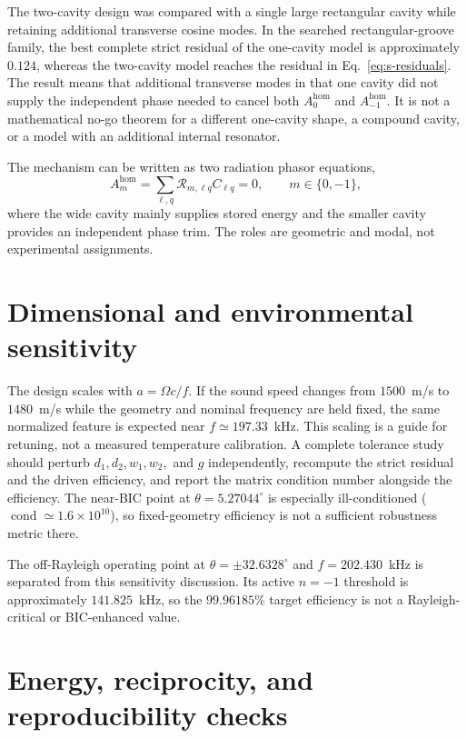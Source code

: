 \documentclass[aps,prl,reprint,superscriptaddress,nofootinbib,floatfix]{revtex4-2}
\providecommand{\hom}{\mathrm{hom}}
\begin{document}
The two-cavity design was compared with a single large rectangular cavity while
retaining additional transverse cosine modes.  In the searched
rectangular-groove family, the best complete strict residual of the one-cavity
model is approximately $0.124$, whereas the two-cavity model reaches the
residual in Eq.~\eqref{eq:s-residuals}.  The result means that additional
transverse modes in that one cavity did not supply the independent phase needed
to cancel both $A_0^{\hom}$ and $A_{-1}^{\hom}$.  It is not a mathematical
no-go theorem for a different one-cavity shape, a compound cavity, or a model
with an additional internal resonator.

The mechanism can be written as two radiation phasor equations,
\begin{equation}
 A_m^{\hom}=\sum_{\ell,q}\mathcal R_{m,\ell q}C_{\ell q}=0,
 \qquad m\in\{0,-1\},
 \label{eq:s-phasors}
\end{equation}
where the wide cavity mainly supplies stored energy and the smaller cavity
provides an independent phase trim.  The roles are geometric and modal, not
experimental assignments.

\section{Dimensional and environmental sensitivity}
\label{sec:s-tolerance}

The design scales with $a=\Omega c/f$.  If the sound speed changes from
$1500$~m/s to $1480$~m/s while the geometry and nominal frequency are held
fixed, the same normalized feature is expected near
$f\simeq197.33$~kHz.  This scaling is a guide for retuning, not a measured
temperature calibration.  A complete tolerance study should perturb
$d_1,d_2,w_1,w_2,$ and $g$ independently, recompute the strict residual and
the driven efficiency, and report the matrix condition number alongside the
efficiency.  The near-BIC point at $\theta=5.27044^{\circ}$ is especially
ill-conditioned ($\operatorname{cond}\simeq1.6\times10^{10}$), so fixed-geometry
efficiency is not a sufficient robustness metric there.

The off-Rayleigh operating point at $\theta=\pm32.6328^{\circ}$ and
$f=202.430$~kHz is separated from this sensitivity discussion.  Its active
$n=-1$ threshold is approximately $141.825$~kHz, so the $99.96185\%$ target
efficiency is not a Rayleigh-critical or BIC-enhanced value.

\section{Energy, reciprocity, and reproducibility checks}
\label{sec:s-checks}
\end{document}
